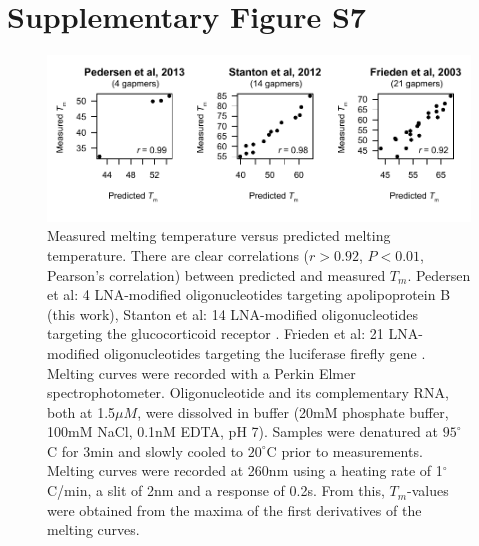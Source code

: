 \documentclass[a4paper,11pt]{article}
\newenvironment{Ncenter}{%
  \setlength\topsep{-10pt}
  \setlength\parskip{-10pt}
  \begin{center}
}{%
  \end{center}
}
\begin{document}
\section{Supplementary Figure S7}
\begin{figure}[!h]
\begin{Ncenter}
\includegraphics[width=\textwidth]{SuppFigS3.pdf}
\end{Ncenter}
\caption{Measured melting temperature versus predicted melting temperature. There are clear correlations ($r > 0.92$, $P < 0.01$, Pearson's correlation) between predicted and measured $T_m$. Pedersen et al: 4 LNA-modified oligonucleotides targeting apolipoprotein B (this work), Stanton et al: 14 LNA-modified oligonucleotides targeting the glucocorticoid receptor \cite{Stanton:2012fu}. Frieden et al: 21 LNA-modified oligonucleotides targeting the luciferase firefly gene \cite{Frieden:2003er}. Melting curves were recorded with a Perkin Elmer spectrophotometer. Oligonucleotide and its complementary RNA, both at 1.5$\mu M$, were dissolved in buffer (20mM phosphate buffer, 100mM NaCl, 0.1nM EDTA, pH 7). Samples were denatured at $95^\circ$C for 3min and slowly cooled to $20^\circ$C prior to measurements. Melting curves were recorded at 260nm using a heating rate of 1$^\circ$C/min, a slit of 2nm and a response of 0.2s. From this, $T_m$-values were obtained from the maxima of the first derivatives of the melting curves.}\label{fig:figTm}
\end{figure}

\newpage

\end{document}

